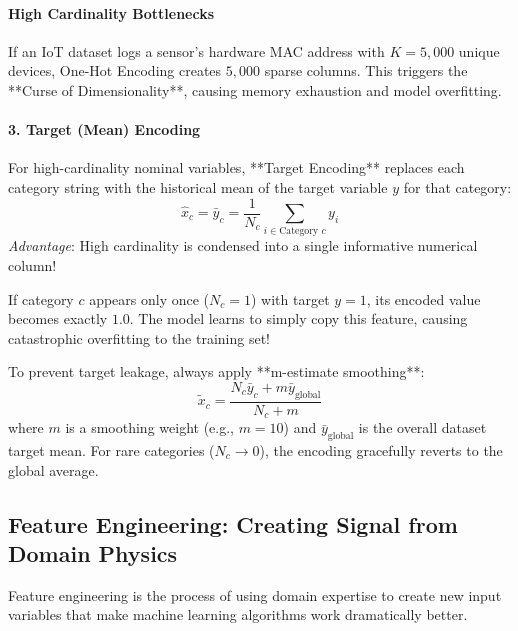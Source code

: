 \paragraph{High Cardinality Bottlenecks}
If an IoT dataset logs a sensor's hardware MAC address with $K = 5{,}000$ unique devices, One-Hot Encoding creates $5{,}000$ sparse columns. This triggers the **Curse of Dimensionality**, causing memory exhaustion and model overfitting.

\paragraph{3. Target (Mean) Encoding}
For high-cardinality nominal variables, **Target Encoding** replaces each category string with the historical mean of the target variable $y$ for that category:
\begin{equation}
\hat{x}_c = \bar{y}_c = \frac{1}{N_c} \sum_{i \in \text{Category } c} y_i\label{eq:target_encoding_raw}
\end{equation}
\textit{Advantage}: High cardinality is condensed into a single informative numerical column!

\begin{warning}
If category $c$ appears only once ($N_c = 1$) with target $y = 1$, its encoded value becomes exactly $1.0$. The model learns to simply copy this feature, causing catastrophic overfitting to the training set!

To prevent target leakage, always apply **m-estimate smoothing**:
\begin{equation}
\tilde{x}_c = \frac{N_c \bar{y}_c + m \bar{y}_{\text{global}}}{N_c + m}\label{eq:target_encoding_smoothed}
\end{equation}
where $m$ is a smoothing weight (e.g., $m = 10$) and $\bar{y}_{\text{global}}$ is the overall dataset target mean. For rare categories ($N_c \to 0$), the encoding gracefully reverts to the global average.
\end{warning}

\subsection{Feature Engineering: Creating Signal from Domain Physics}\label{subsec:feature_engineering}

Feature engineering is the process of using domain expertise to create new input variables that make machine learning algorithms work dramatically better. 

